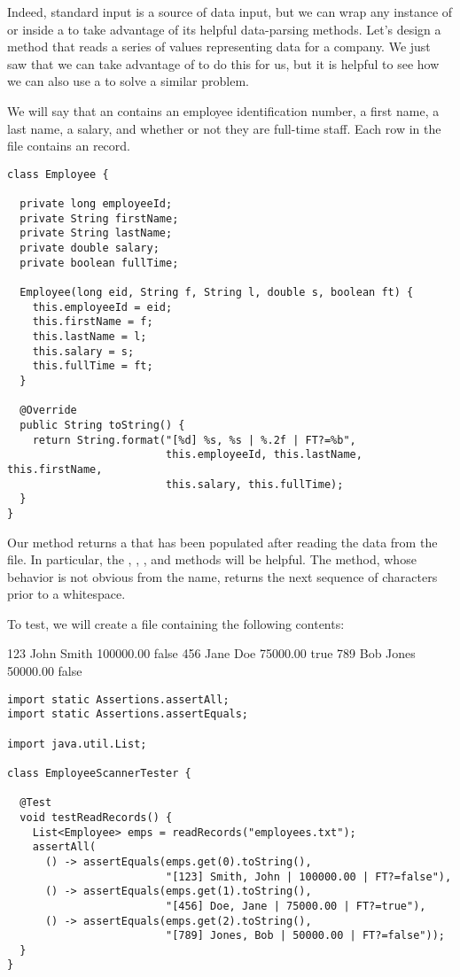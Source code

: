 Indeed, standard input is a source of data input, but we can wrap any instance of  or  inside a  to take advantage of its helpful data-parsing methods. 
Let's design a method that reads a series of values representing  data for a company. 
We just saw that we can take advantage of  to do this for us, but it is helpful to see how we can also use a  to solve a similar problem.

We will say that an  contains an employee identification number, a first name, a last name, a salary, and whether or not they are full-time staff. 
Each row in the file contains an  record.

\begin{lstlisting}[language=MyJava]
class Employee {

  private long employeeId;
  private String firstName;
  private String lastName;
  private double salary;
  private boolean fullTime;
  
  Employee(long eid, String f, String l, double s, boolean ft) {
    this.employeeId = eid;
    this.firstName = f;
    this.lastName = l;
    this.salary = s;
    this.fullTime = ft;
  }

  @Override
  public String toString() {
    return String.format("[%d] %s, %s | %.2f | FT?=%b", 
                         this.employeeId, this.lastName, this.firstName, 
                         this.salary, this.fullTime);
  }
}
\end{lstlisting}

Our method returns a  that has been populated after reading the data from the file. 
In particular, the , , , and  methods will be helpful. 
The  method, whose behavior is not obvious from the name, returns the next sequence of characters prior to a whitespace. 

To test, we will create a file containing the following contents:

\begin{verbnobox}[\small]
123 John Smith 100000.00 false
456 Jane Doe 75000.00 true
789 Bob Jones 50000.00 false
\end{verbnobox}

\begin{lstlisting}[language=MyJava]
import static Assertions.assertAll;
import static Assertions.assertEquals;

import java.util.List;

class EmployeeScannerTester {

  @Test
  void testReadRecords() {
    List<Employee> emps = readRecords("employees.txt");
    assertAll(
      () -> assertEquals(emps.get(0).toString(), 
                         "[123] Smith, John | 100000.00 | FT?=false"),
      () -> assertEquals(emps.get(1).toString(), 
                         "[456] Doe, Jane | 75000.00 | FT?=true"),
      () -> assertEquals(emps.get(2).toString(), 
                         "[789] Jones, Bob | 50000.00 | FT?=false"));
  }
}
\end{lstlisting}

